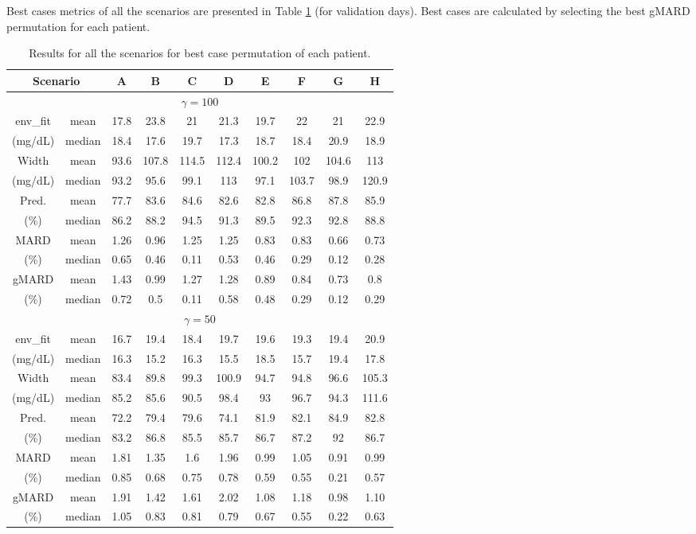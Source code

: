 Best cases metrics of all the scenarios are presented in Table \ref{tab:resultsbestcaseYSISCINS} (for validation days). Best cases are calculated by selecting the best gMARD permutation for each patient.

\begin{table}[hbt]
	\centering
	\begin{tabular}{| c | c | c | c | c | c | c | c | c | c |} 
	\hline
	\multicolumn{2}{|c|}{Scenario} & A & B & C & D & E & F & G & H \\											
	\hline
	\multicolumn{10}{|c|}{$\gamma = 100$} \\
	\hline
	env\_fit & mean & 17.8 & 23.8 & 21 & 21.3 & 19.7 & 22 & 21 & 22.9 \\
	(mg/dL) & median & 18.4 & 17.6 & 19.7 & 17.3 & 18.7 & 18.4 & 20.9 & 18.9 \\
	\hline
	Width & mean & 93.6 & 107.8 & 114.5 & 112.4 & 100.2 & 102 & 104.6 & 113 \\
	(mg/dL) & median & 93.2 & 95.6 & 99.1 & 113 & 97.1 & 103.7 & 98.9 & 120.9 \\
	\hline
	Pred. & mean & 77.7 & 83.6 & 84.6 & 82.6 & 82.8 & 86.8 & 87.8 & 85.9 \\
	(\%) & median & 86.2 & 88.2 & 94.5 & 91.3 & 89.5 & 92.3 & 92.8 & 88.8 \\
	\hline
	MARD & mean & 1.26 & 0.96 & 1.25 & 1.25 & 0.83 & 0.83 & 0.66 & 0.73 \\
	(\%) & median & 0.65 & 0.46 & 0.11 & 0.53 & 0.46 & 0.29 & 0.12 & 0.28 \\
	\hline
	gMARD & mean & 1.43 & 0.99 & 1.27 & 1.28 & 0.89 & 0.84 & 0.73 & 0.8 \\
	(\%) & median & 0.72 & 0.5 & 0.11 & 0.58 & 0.48 & 0.29 & 0.12 & 0.29 \\
\hline
\multicolumn{10}{|c|}{$\gamma = 50$} \\
\hline
	env\_fit & mean & 16.7 & 19.4 & 18.4 & 19.7 & 19.6 & 19.3 & 19.4 & 20.9 \\
	(mg/dL) & median & 16.3 & 15.2 & 16.3 & 15.5 & 18.5 & 15.7 & 19.4 & 17.8 \\
	\hline
	Width & mean & 83.4 & 89.8 & 99.3 & 100.9 & 94.7 & 94.8 & 96.6 & 105.3 \\ 
	(mg/dL) & median & 85.2 & 85.6 & 90.5 & 98.4 & 93 & 96.7 & 94.3 & 111.6 \\
	\hline
	Pred. & mean & 72.2 & 79.4 & 79.6 & 74.1 & 81.9 & 82.1 & 84.9 & 82.8 \\
	(\%) & median & 83.2 & 86.8 & 85.5 & 85.7 & 86.7 & 87.2 & 92 & 86.7 \\
	\hline
	MARD & mean & 1.81 & 1.35 & 1.6 & 1.96 & 0.99 & 1.05 & 0.91 & 0.99 \\
	(\%) & median & 0.85 & 0.68 & 0.75 & 0.78 & 0.59 & 0.55 & 0.21 & 0.57 \\
	\hline
	gMARD & mean & 1.91 & 1.42 & 1.61 & 2.02 & 1.08 & 1.18 & 0.98 & 1.10 \\
	(\%) & median & 1.05 & 0.83 & 0.81 & 0.79 & 0.67 & 0.55 & 0.22 & 0.63 \\
\hline
	\end{tabular}
\caption{Results for all the scenarios for best case permutation of each patient.}
\label{tab:resultsbestcaseYSISCINS}
\end{table}

